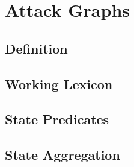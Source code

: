 \chapter{Attack Graphs}
\section{Definition}
\section{Working Lexicon}
\section{State Predicates}
\section{State Aggregation}